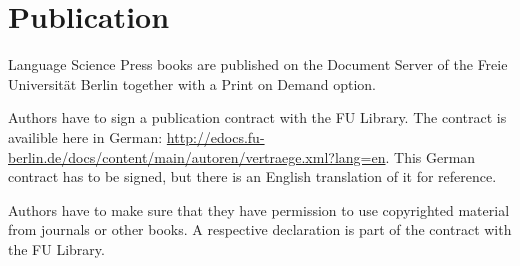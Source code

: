 \chapter{Publication}
\label{chap-publication}


Language Science Press books are published on the Document Server of the Freie Universität Berlin
together with a Print on Demand option.



Authors have to sign a publication contract with the FU Library. The contract is availible here in
German:
\url{http://edocs.fu-berlin.de/docs/content/main/autoren/vertraege.xml?lang=en}. This
German contract has to be signed, but there is an English translation of it for reference.


Authors have to make sure that they have permission to use copyrighted material from journals or
other books. A respective declaration is part of the contract with the FU Library.

